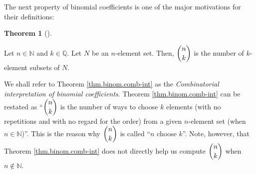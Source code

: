 \documentclass[numbers=enddot,12pt,final,onecolumn,notitlepage]{scrartcl}%
\numberwithin{exer}{subsection}
\theoremstyle{definition}
\newtheorem{theo}{Theorem}[subsection]
\newenvironment{theorem}[1][]
{\begin{theo}[#1]\begin{leftbar}}
{\end{leftbar}\end{theo}}
\begin{document}
The next property of binomial coefficients is one of the major motivations for
their definitions:

\begin{theorem}
\label{thm.binom.comb-int}Let $n\in\mathbb{N}$ and $k\in\mathbb{Q}$. Let $N$
be an $n$-element set. Then, $\dbinom{n}{k}$ is the number of $k$-element
subsets of $N$.
\end{theorem}

We shall refer to Theorem \ref{thm.binom.comb-int} as the
\textit{Combinatorial interpretation of binomial coefficients}. Theorem
\ref{thm.binom.comb-int} can be restated as \textquotedblleft$\dbinom{n}{k}$
is the number of ways to choose $k$ elements (with no repetitions and with no
regard for the order) from a given $n$-element set (when $n\in\mathbb{N}%
$)\textquotedblright. This is the reason why $\dbinom{n}{k}$ is called
\textquotedblleft$n$ choose $k$\textquotedblright. Note, however, that Theorem
\ref{thm.binom.comb-int} does not directly help us compute $\dbinom{n}{k}$
when $n\notin\mathbb{N}$.
\end{document}
